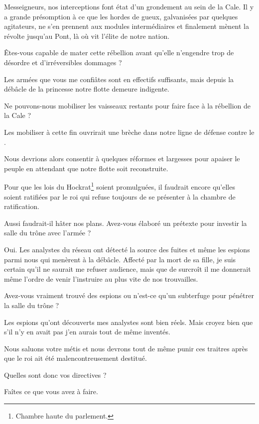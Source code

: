\scene

\StageDirII{\general, \nobleOne, \nobleTwo, \nobleTree}


\begin{drama}
  \generalspeaks Messeigneurs, nos interceptions font état d’un grondement au sein de la Cale. Il y a grande présomption à ce que les hordes de gueux, galvanisées par quelques agitateurs, ne s’en prennent aux modules intermédiaires et finalement mènent la révolte jusqu’au Pont, là où vit l’élite de notre nation.

  \nobleOnespeaks Êtes-vous capable de mater cette rébellion avant qu’elle n’engendre trop de désordre et d’irréversibles dommages ?

  \generalspeaks Les armées que vous me confiâtes sont en effectifs suffisants, mais depuis la débâcle de la princesse \princesse{} notre flotte demeure indigente.

  \nobleTwospeaks Ne pouvons-nous mobiliser les vaisseaux restants pour faire face à la rébellion de la Cale ?

  \generalspeaks Les mobiliser à cette fin ouvrirait une brèche dans notre ligne de défense contre le \campoppose{}.

  \nobleTreespeaks Nous devrions alors consentir à quelques réformes et largesses pour apaiser le peuple en attendant que notre flotte soit reconstruite.

  \generalspeaks Pour que les lois du Hockrat\footnote{Chambre haute du parlement.} soient promulguées, il faudrait encore qu’elles soient ratifiées par le roi qui refuse toujours de se présenter à la chambre de ratification.

  \nobleOnespeaks Aussi faudrait-il hâter nos plans. Avez-vous élaboré un prétexte pour investir la salle du trône avec l’armée ?

  \generalspeaks Oui. Les analystes du réseau ont détecté la source des fuites et même les espions parmi nous qui menèrent à la débâcle. Affecté par la mort de sa fille, je suis certain qu’il ne saurait me refuser audience, mais que de surcroît il me donnerait même l’ordre de venir l’instruire au plus vite de nos trouvailles.

  \nobleTwospeaks Avez-vous vraiment trouvé des espions ou n’est-ce qu’un subterfuge pour pénétrer la salle du trône ?

  \generalspeaks Les espions qu’ont découverts mes analystes sont bien réels. Mais croyez bien que s’il n’y en avait pas j’en aurais tout de même inventés.

  \nobleTreespeaks Nous saluons votre métis et nous devrons tout de même punir ces traitres après que le roi ait été malencontreusement  destitué.

  \generalspeaks Quelles sont donc vos directives ?

   Faîtes ce que vous avez à faire.
\end{drama}

